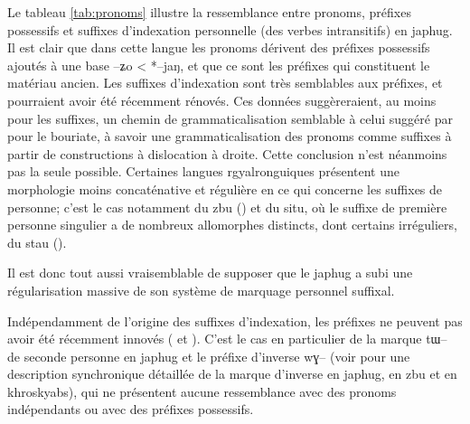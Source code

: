 \documentclass[oldfontcommands,oneside,a4paper,11pt]{article}
\newcommand{\ipa}[1]{{\phon \mbox{#1}}} %
\begin{document}
Le tableau \ref{tab:pronoms} illustre la ressemblance entre pronoms, préfixes possessifs et suffixes d'indexation personnelle (des verbes intransitifs) en japhug. Il est clair que dans cette langue les pronoms dérivent des préfixes possessifs ajoutés à une base \ipa{--ʑo} < *\ipa{--jaŋ}, et que ce sont les préfixes qui constituent le matériau ancien. Les suffixes d'indexation sont très semblables aux préfixes, et pourraient avoir été récemment rénovés. Ces données suggèreraient, au moins pour les suffixes, un chemin de grammaticalisation semblable à celui  suggéré par \citet{comrie80morpho} pour le bouriate, à savoir une grammaticalisation des pronoms comme suffixes à partir de constructions à dislocation à droite. Cette conclusion n'est néanmoins pas la seule possible. Certaines langues rgyalronguiques présentent une morphologie moins concaténative et régulière en ce qui concerne les suffixes de personne; c'est le cas notamment du zbu (\citealt{gongxun14agreement}) et du situ, où le suffixe de première personne singulier a de nombreux allomorphes distincts, dont certains irréguliers, du stau (\citealt{jacques14rtau}). 

Il est donc tout aussi vraisemblable de supposer que le japhug a subi une régularisation massive de son système de marquage personnel suffixal.
   
   Indépendamment de l'origine des suffixes d'indexation,  les préfixes ne peuvent pas avoir été récemment innovés (\citealt{jacques12agreement} et \citealt{delancey14second}). C'est le cas en particulier de la marque \ipa{tɯ--} de seconde personne en japhug et le préfixe d'inverse \ipa{wɣ--} (voir \citealt{jacques10inverse, gongxun14agreement, lai14person} pour une description synchronique détaillée de la marque d'inverse en japhug, en zbu et en khroskyabs), qui ne présentent aucune ressemblance avec des pronoms indépendants ou avec des préfixes possessifs.
   
\end{document}
